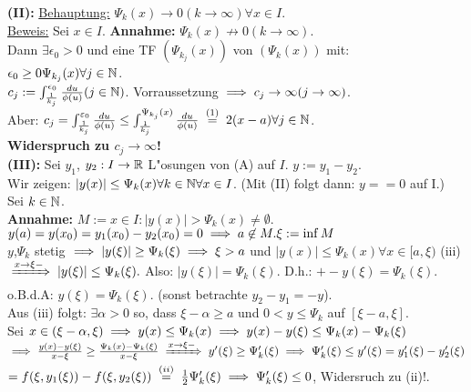 \documentclass[a4paper,twoside,DIV15,BCOR12mm]{scrbook}
\begin{document}
\begin{beweis}
\textbf{(II):} \underline{Behauptung:} $\Psi_k(x)\to 0 (k\to \infty) \forall x \in I$.\\
\underline{Beweis:} Sei $x\in I$. \textbf{ Annahme: } $\Psi_k(x) \not\to 0 (k \to \infty)$. \\
Dann $\exists \epsilon_0 > 0$ und eine TF $(\Psi_{k_j}(x))$ von $(\Psi_k(x))$ mit:\\
$\epsilon_0 \ge 0 \Psi_{k_j}(x)\forall j \in \mathbb{N}$.\\
$c_j:=\int_{\frac{1}{k_j}}^{\epsilon_0}\frac{du}{\phi(u)} (j \in \mathbb{N})$. Vorraussetzung $\implies c_j \to \infty (j\to\infty)$.\\
Aber: $c_j=\int^{\ep_0}_{\frac{1}{k_j}}\frac{du}{\phi(u)} \le \int_{\frac{1}{k_j}}^{\Psi_{k_j}(x)}\frac{du}{\phi(u)} \gleichwegen{(1)} 2(x-a)\forall j\in\MdN$.\\
\textbf{Widerspruch zu $c_j \to \infty$!}\\

\textbf{(III):} Sei $y_1$, $y_2:I\to \mathbb{R}$ L"osungen von (A) auf $I$. $y:=y_1-y_2$. \\
Wir zeigen: $|y(x)|\le \Psi_k(x) \forall k \in \mathbb{N} \forall x \in I$. (Mit (II) folgt dann: $y == 0$ auf I.)\\
Sei $k \in \mathbb{N}$.\\
\textbf{Annahme:} $M:={x \in I:|y(x)| > \Psi_k(x)}\ne \emptyset$.\\
$y(a) = y(x_0)=y_1(x_0)-y_2(x_0)=0 \implies a \not \in M. \xi := \inf M$\\
$y$,$\Psi_k$ stetig $\implies |y(\xi)|\ge\Psi_k(\xi) \implies \xi > a$ und $|y(x)| \le \Psi_k(x) \forall x \in [a,\xi)$ (iii)\\
$\folgtwegen{x\to\xi-} |y(\xi)|\le \Psi_k(\xi).$ Also: $|y(\xi)|=\Psi_k(\xi).$ D.h.: $+- y(\xi) = \Psi_k(\xi).$ o.B.d.A: $y(\xi)=\Psi_k(\xi)$. (sonst betrachte $y_2-y_1=-y$).\\
Aus (iii) folgt: $\exists \alpha > 0$ so, dass $\xi-\alpha \ge a$ und $0 < y \le \Psi_k$ auf $[\xi-a,\xi]$.\\
Sei $x\in(\xi-\alpha,\xi) \implies y(x)\le \Psi_k(x) \implies y(x)-y(\xi)\le \Psi_k(x)-\Psi_k(\xi)$\\
$\folgt \frac{y(x)-y(\xi)}{x-\xi}\ge \frac{\Psi_k(x)-\Psi_k(\xi)}{x-\xi} \folgtwegen{x\to\xi-} y'(\xi)\ge\Psi'_k(\xi) \folgt \Psi'_k(\xi)\le y'(\xi)=y'_1(\xi)-y'_2(\xi)$\\
$=f(\xi,y_1(\xi))-f(\xi,y_2(\xi)) \gleichwegen{(ii)} \frac{1}{2}\Psi'_k(\xi) \folgt \Psi'_k(\xi)\le 0$, Widersruch zu (ii)!.

\end{beweis}
\end{document}
